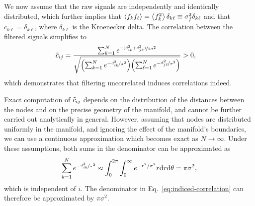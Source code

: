 \documentclass{article}
\begin{document}
We now assume that the raw signals are independently and identically distributed, which further implies that $\expval{f_kf_\ell} = \expval{f_k^2}\delta_{k\ell} \equiv \sigma_{f}^2\delta_{k\ell}$ and that $c_{k\ell} = \delta_{k\ell}$, where $\delta_{k\ell}$ is the Kroenecker delta.
The correlation between the filtered signals simplifies to
\begin{align}
    \Tilde{c}_{ij} &= \frac{\sum_{k = 1}^N e^{\nicefrac{-(d_{ik}^2+d_{jk}^2)}{2\sigma^2}}}{\sqrt{\qty(\sum_{k=1}^N e^{-\nicefrac{d_{ik}^2}{\sigma^2}})\qty(\sum_{\ell=1}^N e^{-\nicefrac{d_{j\ell}^2}{\sigma^2}})}} > 0 ,
    \label{eq:indiced-correlation}
\end{align}
which demonstrates that filtering uncorrelated induces correlations indeed.

Exact computation of $\Tilde{c}_{ij}$ depends on the distribution of the distances between the nodes and on the precise geometry of the manifold, and cannot be further carried out analytically in general.
However, assuming that nodes are distributed uniformly in the manifold, and ignoring the effect of the manifold's boundaries, we can use a continuous approximation which becomes exact as $N\to \infty$.
Under these assumptions, both sums in the denominator can be approximated as
\begin{align*}
    \sum_{k=1}^N e^{-\nicefrac{d_{ik}^2}{\sigma^2}}
      \approx \int_0^{2\pi}\int_0^\infty e^{-r^2/\sigma^2}r\dd r\dd\theta
      = \pi \sigma^2 ,
\end{align*}
which is independent of $i$.
The denominator in Eq.~\eqref{eq:indiced-correlation} can therefore be approximated by $\pi\sigma^2$. 
\end{document}
